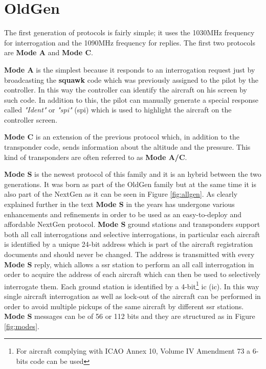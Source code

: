 \documentclass[../main.tex]{subfiles}
\begin{document}
\section{OldGen}

The first generation of protocols is fairly simple; it uses the 1030MHz frequency for interrogation and the 1090MHz frequency for replies.
The first two protocols are \textbf{Mode A} and \textbf{Mode C}.

\textbf{Mode A} is the simplest because it responds to an interrogation request just by broadcasting the \textbf{squawk} code which was previously assigned to the pilot by the controller. In this way the controller can identify the aircraft on his screen by such code. In addition to this, the pilot can manually generate a special response called \textit{"Ident"} or \textit{"\acrshort{spi}"} (\acrlong{spi}) which is used to highlight the aircraft on the controller screen.

\textbf{Mode C} is an extension of the previous protocol which, in addition to the transponder code, sends information about the altitude and the pressure. This kind of transponders are often referred to as \textbf{Mode A/C}.

\textbf{Mode S} is the newest protocol of this family and it is an hybrid between the two generations. It was born as part of the OldGen family but at the same time it is also part of the NextGen as it can be seen in Figure \ref{fig:allgen}. As clearly explained further in the text \textbf{Mode S} in the years has undergone various enhancements and refinements in order to be used as an easy-to-deploy and affordable NextGen protocol. \textbf{Mode S} ground stations and transponders support both all call interrogations and selective interrogations, in particular each aircraft is identified by a unique 24-bit address which is part of the aircraft registration documents and should never be changed. The address is transmitted with every \textbf{Mode S} reply, which allows a \acrshort{ssr} station to perform an all call interrogation in order to acquire the address of each aircraft which can then be used to selectively interrogate them. Each ground station is identified by a 4-bit\footnote{For aircraft complying with ICAO Annex 10, Volume IV Amendment 73 a 6-bits code can be used} \acrlong{ic} (\acrshort{ic}). In this way single aircraft interrogation as well as lock-out of the aircraft can be performed in order to avoid multiple pickups of the same aircraft by different \acrshort{ssr} stations. \textbf{Mode S} messages can be of 56 or 112 bits and they are structured as in Figure \ref{fig:modes}.
\end{document}
